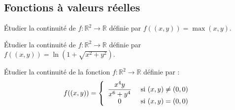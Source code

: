 \documentclass[a4paper,twoside,french,11pt]{VcCours}
\begin{document}
\subsection{Fonctions à valeurs réelles}




\begin{Exercice}{} Étudier la continuité de $f : \mathbb{R}^2 \rightarrow \mathbb{R}$ définie par $ f((x,y))=  \max(x,y)$.
\end{Exercice}


\begin{Exercice}{} Étudier la continuité de $f : \mathbb{R}^2 \rightarrow \mathbb{R}$ définie par $f((x,y))= \ln(1 + \sqrt{x^2+y^2})$.
\end{Exercice}


\begin{Exercice}{} Étudier la continuité de la fonction $f : \mathbb{R}^2 \rightarrow \mathbb{R}$ définie par :
$$ f((x,y)) = \left\lbrace \begin{array}{cl}
\dfrac{x^4 y}{x^6+y^4} & \hbox{ si } (x,y) \neq (0,0) \\
0 & \hbox{ si } (x,y)=(0,0) \\
\end{array}\right.$$
\end{Exercice}

%
\end{document}
